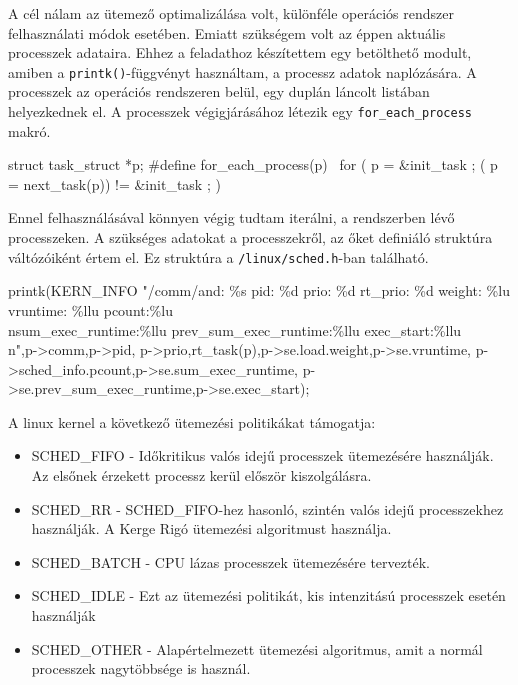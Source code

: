 A cél nálam az ütemező optimalizálása volt, különféle operációs rendszer felhasználati módok esetében. Emiatt szükségem volt az éppen aktuális processzek adataira.
Ehhez a feladathoz készítettem egy betölthető modult, amiben a \texttt{printk()}-függvényt használtam, a processz adatok naplózására.
A processzek az operációs rendszeren belül, egy duplán láncolt listában helyezkednek el.
A processzek végigjárásához létezik egy \texttt{for\_each\_process} makró.
\begin{cpp}
struct task_struct *p;
#define for_each_process(p) \
	 for ( p = &init_task ; ( p = next_task(p)) != &init_task ; )
\end{cpp}
Ennel felhasználásával könnyen végig tudtam iterálni, a rendszerben lévő processzeken. A szükséges adatokat a processzekről, az őket definiáló struktúra váltózóiként értem el. Ez struktúra a \texttt{/linux/sched.h}-ban található.
\begin{cpp}
 printk(KERN_INFO "/comm/and: \%s pid: \%d 
 prio: \%d rt_prio: \%d weight: \%lu 
 vruntime: \%llu pcount:\%lu 
 \\nsum_exec_runtime:\%llu 
 prev_sum_exec_runtime:\%llu 
 exec_start:\%llu\\n",p->comm,p->pid, 
 p->prio,rt_task(p),p->se.load.weight,p->se.vruntime,
 p->sched_info.pcount,p->se.sum_exec_runtime,
 p->se.prev_sum_exec_runtime,p->se.exec_start);
\end{cpp}


\SubSection{Ütemezési politikák(Scheduling policy)}
A linux kernel a következő ütemezési politikákat támogatja:
\begin{itemize}
    \item SCHED\_FIFO - Időkritikus valós idejű processzek ütemezésére használják. Az elsőnek érzekett processz kerül először kiszolgálásra.

	\item	SCHED\_RR - SCHED\_FIFO-hez hasonló, szintén valós idejű processzekhez használják. A Kerge Rigó ütemezési algoritmust használja.

    \item SCHED\_BATCH - CPU lázas processzek ütemezésére tervezték.
    
	\item SCHED\_IDLE - Ezt az ütemezési politikát, kis intenzitású processzek esetén használják
	
	\item SCHED\_OTHER - Alapértelmezett ütemezési algoritmus, amit a normál processzek nagytöbbsége is használ.

\end{itemize}

